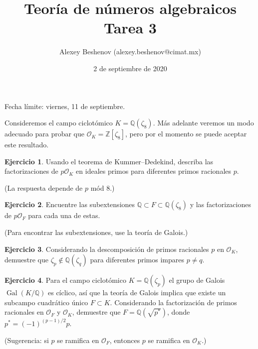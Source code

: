\documentclass{article}
\title{Teoría de números algebraicos\\Tarea 3}
\author{Alexey Beshenov (alexey.beshenov@cimat.mx)}
\date{2 de septiembre de 2020}
\newcounter{tarea}
\theoremstyle{definition}
\newtheorem{ejercicio}{Ejercicio}[tarea]
\begin{document}
{\sffamily\bfseries\maketitle}

\noindent Fecha límite: viernes, 11 de septiembre.

\ifdefined\solutions
\else
\thispagestyle{empty}
\fi

\vspace{1em}

Consideremos el campo ciclotómico $K = \mathbb{Q} (\zeta_8)$.
Más adelante veremos un modo adecuado para probar que
$\mathcal{O}_K = \mathbb{Z}[\zeta_8]$, pero por el momento se puede aceptar este
resultado.

\begin{ejercicio}
  Usando el teorema de Kummer--Dedekind, describa las factorizaciones de
  $p \mathcal{O}_K$ en ideales primos para diferentes primos racionales $p$.

  \noindent (La respuesta depende de $p$ mód $8$.)
\end{ejercicio}

\begin{ejercicio}
  Encuentre las subextensiones
  $\mathbb{Q} \subset F \subset \mathbb{Q} (\zeta_8)$ y las factorizaciones de
  $p \mathcal{O}_F$ para cada una de estas.

  \noindent (Para encontrar las subextensiones, use la teoría de Galois.)
\end{ejercicio}

\begin{ejercicio}
  Considerando la descomposición de primos racionales $p$ en $\mathcal{O}_K$,
  demuestre que $\zeta_p \notin \mathbb{Q} (\zeta_q)$ para diferentes primos
  impares $p \ne q$.
\end{ejercicio}

\begin{ejercicio}
  Para el campo ciclotómico $K = \mathbb{Q} (\zeta_p)$ el grupo de Galois
  $\operatorname{Gal} (K/\mathbb{Q})$ es cíclico, así que la teoría de Galois
  implica que existe un subcampo cuadrático único $F \subset K$. Considerando
  la factorización de primos racionales en $\mathcal{O}_F$ y $\mathcal{O}_K$,
  demuestre que $F = \mathbb{Q} (\sqrt{p^*})$, donde $p^* = (-1)^{(p-1)/2} p$.

  \noindent (Sugerencia: si $p$ se ramifica en $\mathcal{O}_F$, entonces $p$ se
  ramifica en $\mathcal{O}_K$.)
\end{ejercicio}
\end{document}
